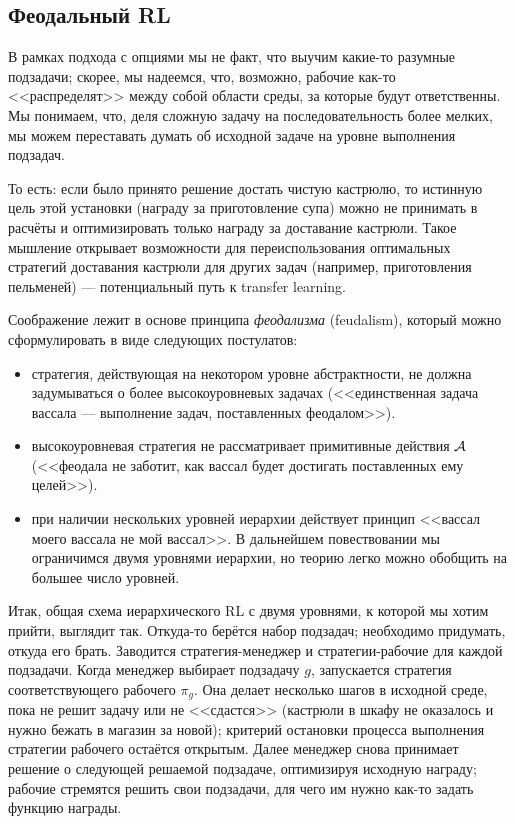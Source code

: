 \subsection{Феодальный RL}

В рамках подхода с опциями мы не факт, что выучим какие-то разумные подзадачи; скорее, мы надеемся, что, возможно, рабочие как-то <<распределят>> между собой области среды, за которые будут ответственны. Мы понимаем, что, деля сложную задачу на последовательность более мелких, мы можем переставать думать об исходной задаче на уровне выполнения подзадач. 

\begin{example}
То есть: если было принято решение достать чистую кастрюлю, то истинную цель этой установки (награду за приготовление супа) можно не принимать в расчёты и оптимизировать только награду за доставание кастрюли. Такое мышление открывает возможности для переиспользования оптимальных стратегий доставания кастрюли для других задач (например, приготовления пельменей) --- потенциальный путь к transfer learning.
\end{example}

Соображение лежит в основе принципа \emph{феодализма} (feudalism), который можно сформулировать в виде следующих постулатов:
\begin{itemize}
    \item стратегия, действующая на некотором уровне абстрактности, не должна задумываться о более высокоуровневых задачах (<<единственная задача вассала --- выполнение задач, поставленных феодалом>>).
    \item высокоуровневая стратегия не рассматривает примитивные действия $\mathcal{A}$ (<<феодала не заботит, как вассал будет достигать поставленных ему целей>>).
    \item при наличии нескольких уровней иерархии действует принцип <<вассал моего вассала не мой вассал>>. В дальнейшем повествовании мы ограничимся двумя уровнями иерархии, но теорию легко можно обобщить на большее число уровней.
\end{itemize}

Итак, общая схема иерархического RL с двумя уровнями, к которой мы хотим прийти, выглядит так. Откуда-то берётся набор подзадач; необходимо придумать, откуда его брать. Заводится стратегия-менеджер и стратегии-рабочие для каждой подзадачи. Когда менеджер выбирает подзадачу $g$, запускается стратегия соответствующего рабочего $\pi_g$. Она делает несколько шагов в исходной среде, пока не решит задачу или не <<сдастся>> (кастрюли в шкафу не оказалось и нужно бежать в магазин за новой); критерий остановки процесса выполнения стратегии рабочего остаётся открытым. Далее менеджер снова принимает решение о следующей решаемой подзадаче, оптимизируя исходную награду; рабочие стремятся решить свои подзадачи, для чего им нужно как-то задать функцию награды. 

